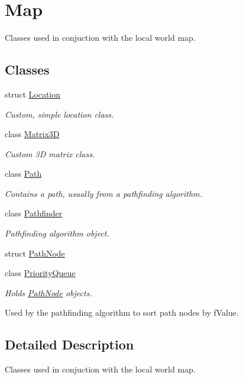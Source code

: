 \hypertarget{group__map}{\section{Map}
\label{group__map}
}


Classes used in conjuction with the local world map.  


\subsection*{Classes}
\begin{DoxyCompactItemize}
\item 
struct \hyperlink{structLocation}{Location}
\begin{DoxyCompactList}\small\item\em Custom, simple location class. \end{DoxyCompactList}\item 
class \hyperlink{classMatrix3D}{Matrix3\-D}
\begin{DoxyCompactList}\small\item\em Custom 3\-D matrix class. \end{DoxyCompactList}\item 
class \hyperlink{classPath}{Path}
\begin{DoxyCompactList}\small\item\em Contains a path, usually from a pathfinding algorithm. \end{DoxyCompactList}\item 
class \hyperlink{classPathfinder}{Pathfinder}
\begin{DoxyCompactList}\small\item\em Pathfinding algorithm object. \end{DoxyCompactList}\item 
struct \hyperlink{structPathNode}{Path\-Node}
\item 
class \hyperlink{classPriorityQueue}{Priority\-Queue}
\begin{DoxyCompactList}\small\item\em Holds \hyperlink{structPathNode}{Path\-Node} objects.

Used by the pathfinding algorithm to sort path nodes by f\-Value. \end{DoxyCompactList}\end{DoxyCompactItemize}


\subsection{Detailed Description}
Classes used in conjuction with the local world map. 